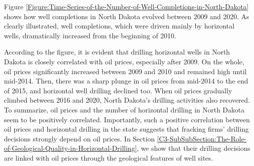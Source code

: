 Figure \ref{Figure:Time-Series-of-the-Number-of-Well-Completions-in-North-Dakota} shows how well completions in North Dakota evolved between 2009 and 2020. As clearly illustrated, well completions, which were driven mainly by horizontal wells, dramatically increased from the beginning of 2010. 

According to the figure, it is evident that drilling horizontal wells in North Dakota is closely correlated with oil prices, especially after 2009. On the whole, oil prices significantly increased between 2009 and 2010 and remained high until mid-2014. Then, there was a sharp plunge in oil prices from mid-2014 to the end of 2015, and horizontal well drilling declined too. When oil prices gradually climbed between 2016 and 2020, North Dakota's drilling activities also recovered. To summarize, oil prices and the number of horizontal drilling in North Dakota seem to be positively correlated. Importantly, such a positive correlation between oil prices and horizontal drilling in the state suggests that fracking firms' drilling decisions strongly depend on oil prices. In Section \ref{C3-SubSubSection:The-Role-of-Geological-Quality-in-Horizontal-Drilling}, we show that their drilling decisions are linked with oil prices through the geological features of well sites.
